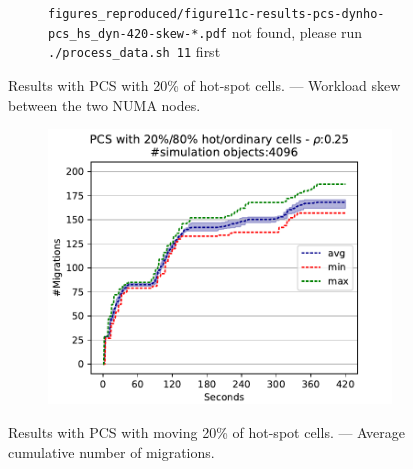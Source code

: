 \documentclass[]{article}
\begin{document}
\begin{figure}[!h]
{}
{
\begin{subfigure}[b]{\mysize}
\centering
\texttt{figures\_reproduced/figure11c-results-pcs-dynho-pcs\_hs\_dyn-420-skew-*.pdf} not found, please run \texttt{./process\_data.sh 11} first
\renewcommand{\thesubfigure}{Reproduced 6}
\caption{}
\end{subfigure}
}

\caption{Results with PCS with 20\% of hot-spot cells. --- Workload skew between the two NUMA nodes.}
\end{figure}






\setcounter{figure}{10}
\renewcommand{\thefigure}{\arabic{figure}c}
\renewcommand{\mysize}{0.2\linewidth}

\begin{figure}[!h]
\centering
\begin{subfigure}[b]{\mysize}
\centering
\includegraphics[width=\linewidth]{figures_original/results-pcs-dyn-0.48-pcs_hs-420-mcnt.pdf}
\renewcommand{\thesubfigure}{Original}
\caption{}
\end{subfigure}
\begin{subfigure}[b]{\mysize}
\centering
{}
\renewcommand{\thesubfigure}{Reproduced}
\caption{}
\end{subfigure}
\caption{Results with PCS with moving 20\% of hot-spot cells. --- Average cumulative number of migrations.}
\end{figure}
\end{document}
